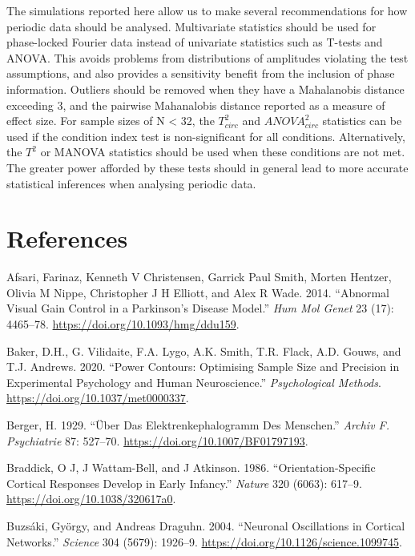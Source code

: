\documentclass[]{article}
\begin{document}
The simulations reported here allow us to make several recommendations for how periodic data should be analysed. Multivariate statistics should be used for phase-locked Fourier data instead of univariate statistics such as T-tests and ANOVA. This avoids problems from distributions of amplitudes violating the test assumptions, and also provides a sensitivity benefit from the inclusion of phase information. Outliers should be removed when they have a Mahalanobis distance exceeding 3, and the pairwise Mahanalobis distance reported as a measure of effect size. For sample sizes of N \textless{} 32, the \(T^2_{circ}\) and \(ANOVA^2_{circ}\) statistics can be used if the condition index test is non-significant for all conditions. Alternatively, the \(T^2\) or MANOVA statistics should be used when these conditions are not met. The greater power afforded by these tests should in general lead to more accurate statistical inferences when analysing periodic data.

\hypertarget{references}{%
\section*{References}\label{references}}

\hypertarget{refs}{}
\leavevmode\hypertarget{ref-Afsari2014}{}%
Afsari, Farinaz, Kenneth V Christensen, Garrick Paul Smith, Morten Hentzer, Olivia M Nippe, Christopher J H Elliott, and Alex R Wade. 2014. ``Abnormal Visual Gain Control in a Parkinson's Disease Model.'' \emph{Hum Mol Genet} 23 (17): 4465--78. \url{https://doi.org/10.1093/hmg/ddu159}.

\leavevmode\hypertarget{ref-Baker2020}{}%
Baker, D.H., G. Vilidaite, F.A. Lygo, A.K. Smith, T.R. Flack, A.D. Gouws, and T.J. Andrews. 2020. ``Power Contours: Optimising Sample Size and Precision in Experimental Psychology and Human Neuroscience.'' \emph{Psychological Methods}. \url{https://doi.org/10.1037/met0000337}.

\leavevmode\hypertarget{ref-Berger1929}{}%
Berger, H. 1929. ``Über Das Elektrenkephalogramm Des Menschen.'' \emph{Archiv F. Psychiatrie} 87: 527--70. \url{https://doi.org/10.1007/BF01797193}.

\leavevmode\hypertarget{ref-Braddick1986}{}%
Braddick, O J, J Wattam-Bell, and J Atkinson. 1986. ``Orientation-Specific Cortical Responses Develop in Early Infancy.'' \emph{Nature} 320 (6063): 617--9. \url{https://doi.org/10.1038/320617a0}.

\leavevmode\hypertarget{ref-Buzsaki2004}{}%
Buzsáki, György, and Andreas Draguhn. 2004. ``Neuronal Oscillations in Cortical Networks.'' \emph{Science} 304 (5679): 1926--9. \url{https://doi.org/10.1126/science.1099745}.
\end{document}

